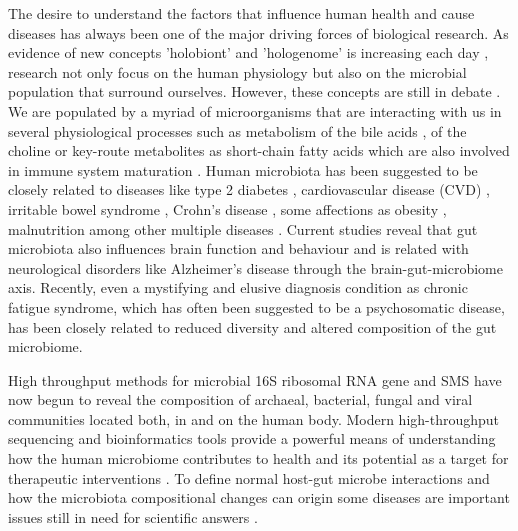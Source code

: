 The desire to understand the factors that influence human health and cause diseases has always been one of the major driving forces of biological research. As evidence of new concepts 'holobiont' and 'hologenome' is increasing each day \cite{holo1, holo2}, research not only focus on the human physiology but also on the microbial population that surround ourselves. However, these concepts are still in debate \cite{holo3}. We are populated by a myriad of microorganisms that are interacting with us in several physiological processes such as metabolism of the bile acids \cite{bileacids}, of the choline \cite{choline} or key-route metabolites as short-chain fatty acids \cite{scfa1, scfa2} which are also involved in immune system maturation \cite{scfa3, scfa4}. Human microbiota has been suggested to be closely related to diseases like type 2 diabetes \cite{diabetes2}, cardiovascular disease (CVD) \cite{CVD}, irritable bowel syndrome \cite{IBS}, Crohn's disease \cite{CD}, some affections as obesity \cite{ob1, ob2}, malnutrition \cite{nutr} among other multiple diseases \cite{Moya_trends}. Current studies reveal that gut microbiota also influences brain function and behaviour and is related with neurological disorders like Alzheimer's disease through the brain-gut-microbiome axis\cite{mind,AD}. Recently, even a mystifying and elusive diagnosis condition as chronic fatigue syndrome, which has often been suggested to be a psychosomatic disease, has been closely related to reduced diversity and altered composition of the gut microbiome\cite{CFS}. 

High throughput methods for microbial 16S ribosomal RNA gene and SMS have now begun to reveal the composition of archaeal, bacterial, fungal and viral communities located both, in and on the human body. Modern high-throughput sequencing and bioinformatics tools provide a powerful means of understanding how the human microbiome contributes to health and its potential as a target for therapeutic interventions \cite{microb&health}. To define normal host-gut microbe interactions and how the microbiota compositional changes can origin some diseases are important issues still in need for scientific answers \cite{normal1, normal2, panthropology}.

